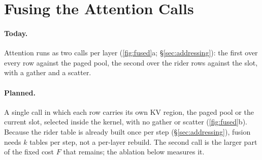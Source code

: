
\section{Fusing the Attention Calls}\label{sec:fusion-app}\label{sec:fused}




\paragraph{Today.} Attention runs as two calls per layer (\cref{fig:fused}a;
\S\ref{sec:addressing}): the first over every row against the paged pool, the
second over the rider rows against the slot, with a gather and a scatter.

\paragraph{Planned.} A single call in which each row carries its own KV region,
the paged pool or the current slot, selected inside the kernel, with no gather
or scatter (\cref{fig:fused}b). Because the rider table is already built once
per step (\S\ref{sec:addressing}), fusion needs $k$ tables per step, not a
per-layer rebuild. The second call is the larger part of the fixed cost $F$
that remains; the ablation below measures it.



